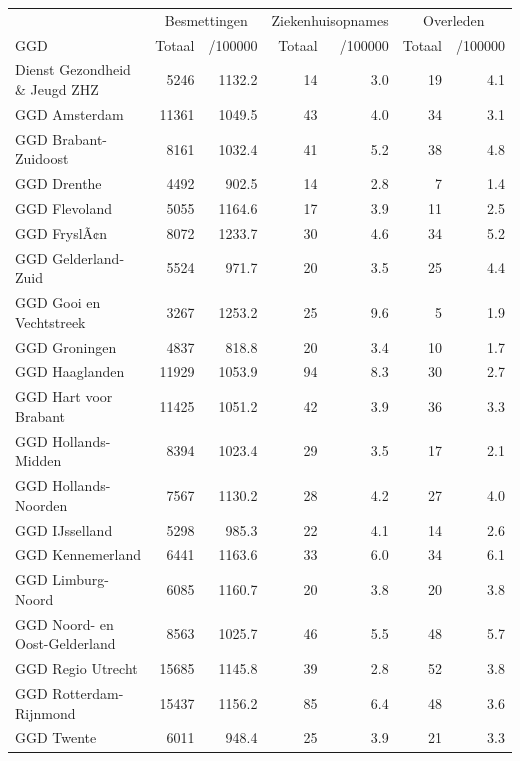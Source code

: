 \documentclass[
  english,
  man,floatsintext]{apa6}
\begin{document}
\begin{table}
\centering\begingroup\fontsize{10}{12}\selectfont

\begin{threeparttable}
\begin{tabular}{lrrrrrr}
\toprule
\multicolumn{1}{c}{ } & \multicolumn{2}{c}{Besmettingen} & \multicolumn{2}{c}{Ziekenhuisopnames} & \multicolumn{2}{c}{Overleden} \\
\cmidrule(l{3pt}r{3pt}){2-3} \cmidrule(l{3pt}r{3pt}){4-5} \cmidrule(l{3pt}r{3pt}){6-7}
GGD & Totaal & /100000 & Totaal & /100000 & Totaal & /100000\\
\midrule
Dienst Gezondheid \& Jeugd ZHZ & 5246 & 1132.2 & 14 & 3.0 & 19 & 4.1\\
GGD Amsterdam & 11361 & 1049.5 & 43 & 4.0 & 34 & 3.1\\
GGD Brabant-Zuidoost & 8161 & 1032.4 & 41 & 5.2 & 38 & 4.8\\
GGD Drenthe & 4492 & 902.5 & 14 & 2.8 & 7 & 1.4\\
GGD Flevoland & 5055 & 1164.6 & 17 & 3.9 & 11 & 2.5\\
GGD FryslÃ¢n & 8072 & 1233.7 & 30 & 4.6 & 34 & 5.2\\
GGD Gelderland-Zuid & 5524 & 971.7 & 20 & 3.5 & 25 & 4.4\\
GGD Gooi en Vechtstreek & 3267 & 1253.2 & 25 & 9.6 & 5 & 1.9\\
GGD Groningen & 4837 & 818.8 & 20 & 3.4 & 10 & 1.7\\
GGD Haaglanden & 11929 & 1053.9 & 94 & 8.3 & 30 & 2.7\\
GGD Hart voor Brabant & 11425 & 1051.2 & 42 & 3.9 & 36 & 3.3\\
GGD Hollands-Midden & 8394 & 1023.4 & 29 & 3.5 & 17 & 2.1\\
GGD Hollands-Noorden & 7567 & 1130.2 & 28 & 4.2 & 27 & 4.0\\
GGD IJsselland & 5298 & 985.3 & 22 & 4.1 & 14 & 2.6\\
GGD Kennemerland & 6441 & 1163.6 & 33 & 6.0 & 34 & 6.1\\
GGD Limburg-Noord & 6085 & 1160.7 & 20 & 3.8 & 20 & 3.8\\
GGD Noord- en Oost-Gelderland & 8563 & 1025.7 & 46 & 5.5 & 48 & 5.7\\
GGD Regio Utrecht & 15685 & 1145.8 & 39 & 2.8 & 52 & 3.8\\
GGD Rotterdam-Rijnmond & 15437 & 1156.2 & 85 & 6.4 & 48 & 3.6\\
GGD Twente & 6011 & 948.4 & 25 & 3.9 & 21 & 3.3\\

\end{tabular}
\end{threeparttable}
\end{table}
\end{document}
